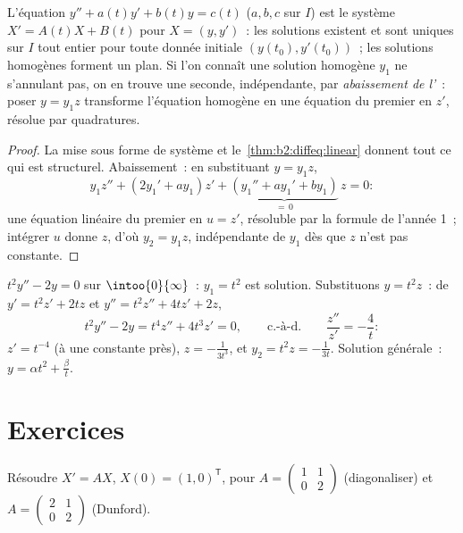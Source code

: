 \begin{proposition}\label{prop:b2:diffeq:secondorder}
L'équation $y'' + a(t)y' + b(t)y = c(t)$ ($a, b, c$  sur
$I$) est le système $X' = A(t)X + B(t)$ pour $X = (y, y')$~: les
solutions existent et sont uniques sur $I$ tout entier pour toute
donnée initiale $(y(t_0), y'(t_0))$~; les solutions homogènes
forment un plan. Si l'on connaît une solution homogène $y_1$ ne
s'annulant pas, on en trouve une seconde, indépendante, par
\emph{abaissement de l'}~: poser $y = y_1 z$ transforme
l'équation homogène en une équation du premier  en $z'$,
résolue par quadratures.
\end{proposition}

\begin{proof}
La mise sous forme de système et le~\cref{thm:b2:diffeq:linear}
donnent tout ce qui est structurel. Abaissement~: en substituant $y
= y_1z$,
\[
y_1 z'' + (2y_1' + a y_1)z' + \underbrace{(y_1'' + ay_1' +
by_1)}_{=\,0}\,z = 0 :
\]
une équation linéaire du premier  en $u = z'$, résoluble par la
formule de l'année 1~; intégrer $u$ donne $z$, d'où $y_2 = y_1 z$,
indépendante de $y_1$ dès que $z$ n'est pas constante.
\end{proof}

\begin{example}\label{ex:b2:diffeq:lowering}
$t^2y'' - 2y = 0$ sur $\intoo{0}{\infty}$~: $y_1 = t^2$ est
solution. Substituons $y = t^2z$~: de $y' = t^2z' + 2tz$ et $y''
= t^2z'' + 4tz' + 2z$,
\[
t^2y'' - 2y = t^4 z'' + 4t^3z' = 0,
\qquad\text{c.-à-d.}\qquad \frac{z''}{z'} = -\frac4t :
\]
$z' = t^{-4}$ (à une constante près), $z = -\frac{1}{3t^3}$, et
$y_2 = t^2z = -\frac{1}{3t}$. Solution générale~: $y = \alpha t^2 +
\frac{\beta}{t}$.
\end{example}

\section{Exercices}

\begin{exercise}[$\star$]\label{exo:b2:diffeq:1}
Résoudre $X' = AX$, $X(0) = (1, 0)^{\mathsf T}$, pour $A =
\begin{pmatrix} 1 & 1\\ 0 & 2\end{pmatrix}$ (diagonaliser) et $A =
\begin{pmatrix} 2 & 1\\ 0 & 2 \end{pmatrix}$ (Dunford).
\end{exercise}

